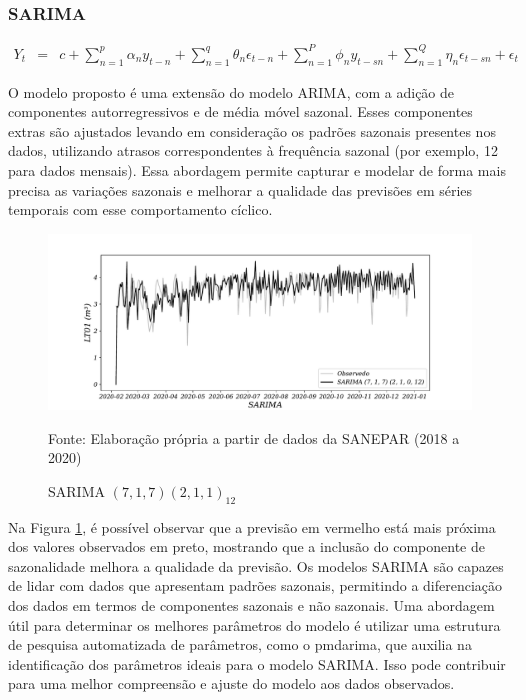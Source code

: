 \subsubsection{SARIMA}

\begin{eqnarray}
	Y_t&=&c+\sum_{n=1}^p \alpha_n y_{t-n}+\sum_{n=1}^q \theta_n \epsilon_{t-n}+\sum_{n=1}^P \phi_n y_{t-s n}+\sum_{n=1}^Q \eta_n \epsilon_{t-s n}+\epsilon_t \label{sarima}
\end{eqnarray}

O modelo proposto é uma extensão do modelo ARIMA, com a adição de componentes autorregressivos e de média móvel sazonal. Esses componentes extras são ajustados levando em consideração os padrões sazonais presentes nos dados, utilizando atrasos correspondentes à frequência sazonal (por exemplo, 12 para dados mensais). Essa abordagem permite capturar e modelar de forma mais precisa as variações sazonais e melhorar a qualidade das previsões em séries temporais com esse comportamento cíclico.

\begin{figure}[H]
	\centering
	\caption{SARIMA $(7,1,7) (2,1,1)_{12}$}
	\label{fig:1-sarima}
	\includegraphics[width=0.9\linewidth]{Modelos/Figuras/0-SARIMA}
	
	Fonte: Elaboração própria a partir de dados da SANEPAR (2018 a 2020)
\end{figure}

Na Figura \ref{fig:1-sarima}, é possível observar que a previsão em vermelho está mais próxima dos valores observados em preto, mostrando que a inclusão do componente de sazonalidade melhora a qualidade da previsão. Os modelos SARIMA são capazes de lidar com dados que apresentam padrões sazonais, permitindo a diferenciação dos dados em termos de componentes sazonais e não sazonais. Uma abordagem útil para determinar os melhores parâmetros do modelo é utilizar uma estrutura de pesquisa automatizada de parâmetros, como o pmdarima, que auxilia na identificação dos parâmetros ideais para o modelo SARIMA. Isso pode contribuir para uma melhor compreensão e ajuste do modelo aos dados observados.

